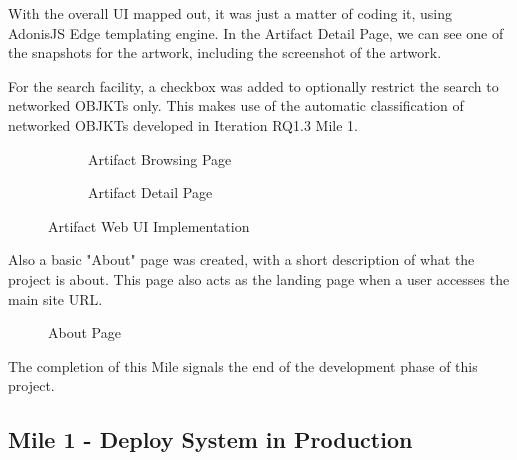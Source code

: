 With the overall UI mapped out, it was just a matter of coding it, using AdonisJS Edge templating engine. In the Artifact Detail Page, we can see one of the snapshots for the artwork, including the screenshot of the artwork.

For the search facility, a checkbox was added to optionally restrict the search to networked OBJKTs only. This makes use of the automatic classification of networked OBJKTs developed in Iteration RQ1.3 Mile 1.

\begin{figure}[h]
  \centering
  \begingroup
  \setlength{\fboxsep}{0pt} %
  \setlength{\fboxrule}{1pt} %
  \begin{subfigure}[b]{0.45\textwidth}
    \centering
    \caption{Artifact Browsing Page}
    \label{fig:wireframe1}
  \end{subfigure}
  \hfill
  \begin{subfigure}[b]{0.45\textwidth}
    \centering
    \caption{Artifact Detail Page}
    \label{fig:wireframe2}
  \end{subfigure}
  \endgroup
  \caption{Artifact Web UI Implementation}
  \label{fig:web-implementation}
\end{figure}

Also a basic "About" page was created, with a short description of what the project is about. This page also acts as the landing page when a user accesses the main site URL.

\begin{figure}[h]
    \centering
    \begingroup
    \setlength{\fboxsep}{0pt} %
    \setlength{\fboxrule}{1pt} %
    \endgroup
    \caption[About Page]{About Page}
    \label{fig:about-page}
\end{figure}



The completion of this Mile signals the end of the development phase of this project.

\subsection {Mile 1 - Deploy System in Production}

